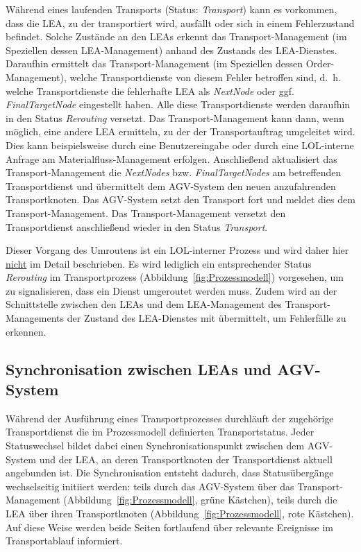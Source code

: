Während eines laufenden Transports (Status: \emph{Transport}) kann es vorkommen, dass die LEA, zu der transportiert wird, ausfällt oder sich in einem Fehlerzustand befindet. Solche Zustände an den LEAs erkennt das Transport-Management (im Speziellen dessen LEA-Management) anhand des Zustands des LEA-Dienstes. Daraufhin ermittelt das Transport-Management (im Speziellen dessen Order-Management), welche Transportdienste von diesem Fehler betroffen sind, d.~h. welche Transportdienste die fehlerhafte LEA als \emph{NextNode} oder ggf. \emph{FinalTargetNode} eingestellt haben. Alle diese Transportdienste werden daraufhin in den Status \emph{Rerouting} versetzt. Das Transport-Management kann dann, wenn möglich, eine andere LEA ermitteln, zu der der Transportauftrag umgeleitet wird. Dies kann beispielsweise durch eine Benutzereingabe oder durch eine LOL-interne Anfrage am Materialfluss-Management erfolgen. Anschließend aktualisiert das Transport-Management die \emph{NextNodes} bzw. \emph{Final\-Target\-Nodes} am betreffenden Transportdienst und übermittelt dem AGV-System den neuen anzufahrenden Transportknoten. Das AGV-System setzt den Transport fort und meldet dies dem Transport-Management. Das Transport-Management versetzt den Transportdienst anschließend wieder in den Status \emph{Transport}. 

Dieser Vorgang des Umroutens ist ein LOL-interner Prozess und wird daher hier \underline{nicht} im Detail beschrieben. Es wird lediglich ein entsprechender Status \emph{Rerouting} im Transportprozess (Abbildung~\ref{fig:Prozessmodell}) vorgesehen, um zu signalisieren, dass ein Dienst umgeroutet werden muss. Zudem wird an der Schnittstelle zwischen den LEAs und dem LEA-Management des Transport-Managements der Zustand des LEA-Dienstes mit übermittelt, um Fehlerfälle zu erkennen.

\subsection{Synchronisation zwischen LEAs und AGV-System}
\label{subsec:SyncLeaAgv}

Während der Ausführung eines Transportprozesses durchläuft der zugehörige Transportdienst die im Prozessmodell definierten Transportstatus. Jeder Statuswechsel bildet dabei einen Synchronisationspunkt zwischen dem AGV-System und der LEA, an deren Transportknoten der Transportdienst aktuell angebunden ist. Die Synchronisation entsteht dadurch, dass Statusübergänge wechselseitig initiiert werden: teils durch das AGV-System über das Transport-Management (Abbildung~\ref{fig:Prozessmodell}, grüne Kästchen), teils durch die LEA über ihren Transportknoten (Abbildung~\ref{fig:Prozessmodell}, rote Kästchen). Auf diese Weise werden beide Seiten fortlaufend über relevante Ereignisse im Transportablauf informiert. 

